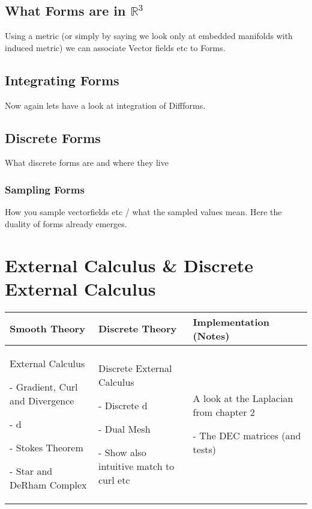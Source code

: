\documentclass[draft]{scrbook}
\newenvironment{packed_enum}{
\begin{enumerate}
  \setlength{\itemsep}{1pt}
  \setlength{\parskip}{0pt}
  \setlength{\parsep}{0pt}
}{\end{enumerate}}
\begin{document}
	\subsection{What Forms are in $\mathbb{R}^3$}
		Using a metric (or simply by saying we look only at embedded manifolds with induced metric) we can associate
		Vector fields etc to Forms.
	\subsection{Integrating Forms}
		Now again lets have a look at integration of Diffforms.
	\subsection{Discrete Forms}
		What discrete forms are and where they live
	\subsubsection{Sampling Forms}
		How you sample vectorfields etc / what the sampled values mean. Here the duality of forms already emerges.
	
\newpage		
\section{External Calculus \& Discrete External Calculus}
	\begin{longtable}{|p{4.5cm}|p{4.5cm}|p{4.5cm}|}
		\hline
		Smooth Theory& Discrete Theory& Implementation (Notes)\\
		\hline
			External Calculus
			\begin{packed_enum}
				\item[-] Gradient, Curl and Divergence
				\item[-] d
				\item[-] Stokes Theorem
				\item[-] Star and DeRham Complex
			\end{packed_enum}
			&
			Discrete External Calculus
			\begin{packed_enum}
				\item[-] Discrete d
				\item[-] Dual Mesh
				\item[-] Show also intuitive match to curl etc
			\end{packed_enum}
			 & 
			 A look at the Laplacian from chapter 2
			 \begin{packed_enum}
				\item[-] The DEC matrices (and tests)
			\end{packed_enum}
			 \\		
		\hline
	\end{longtable}
\end{document}
